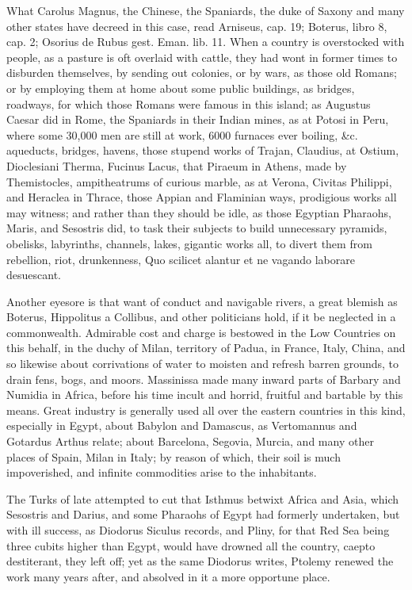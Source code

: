{What Carolus Magnus, the Chinese, the Spaniards, the duke of Saxony and
many other states have decreed in this case, read Arniseus, cap. 19;
Boterus, libro 8, cap. 2; Osorius de Rubus gest. Eman. lib. 11. When a
country is overstocked with people, as a pasture is oft overlaid with
cattle, they had wont in former times to disburden themselves, by
sending out colonies, or by wars, as those old Romans; or by employing
them at home about some public buildings, as bridges, roadways, for
which those Romans were famous in this island; as Augustus Caesar did
in Rome, the Spaniards in their Indian mines, as at Potosi in Peru,
where some 30,000 men are still at work, 6000 furnaces ever boiling,
\&c. aqueducts, bridges, havens, those stupend works of Trajan,
Claudius, at Ostium, Dioclesiani Therma, Fucinus Lacus, that
Piraeum in Athens, made by Themistocles, ampitheatrums of curious
marble, as at Verona, Civitas Philippi, and Heraclea in Thrace, those
Appian and Flaminian ways, prodigious works all may witness; and rather
than they should be idle, as those  Egyptian Pharaohs, Maris,
and Sesostris did, to task their subjects to build unnecessary
pyramids, obelisks, labyrinths, channels, lakes, gigantic works all, to
divert them from rebellion, riot, drunkenness, Quo scilicet
alantur et ne vagando laborare desuescant.

Another eyesore is that want of conduct and navigable rivers, a great
blemish as Boterus, Hippolitus a Collibus, and other
politicians hold, if it be neglected in a commonwealth. Admirable cost
and charge is bestowed in the Low Countries on this behalf, in the
duchy of Milan, territory of Padua, in France, Italy, China, and
so likewise about corrivations of water to moisten and refresh barren
grounds, to drain fens, bogs, and moors. Massinissa made many inward
parts of Barbary and Numidia in Africa, before his time incult and
horrid, fruitful and bartable by this means. Great industry is
generally used all over the eastern countries in this kind, especially
in Egypt, about Babylon and Damascus, as Vertomannus and Gotardus
Arthus relate; about Barcelona, Segovia, Murcia, and many other places
of Spain, Milan in Italy; by reason of which, their soil is much
impoverished, and infinite commodities arise to the inhabitants.

The Turks of late attempted to cut that Isthmus betwixt Africa and
Asia, which Sesostris and Darius, and some Pharaohs of Egypt had
formerly undertaken, but with ill success, as Diodorus Siculus
records, and Pliny, for that Red Sea being three cubits higher
than Egypt, would have drowned all the country, caepto destiterant,
they left off; yet as the same Diodorus writes, Ptolemy renewed
the work many years after, and absolved in it a more opportune place.

}
